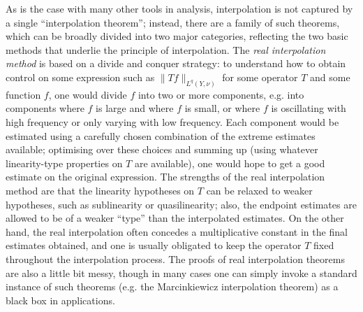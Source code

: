 \documentclass[10pt,reqno]{amsart}
\begin{document}
As is the case with many other tools in analysis, interpolation is not captured by a single “interpolation theorem”; instead, there are a family of such theorems, which can be broadly divided into two major categories, reflecting the two basic methods that underlie the principle of interpolation. The \emph{real interpolation method} is based on a divide and conquer strategy: to understand how to obtain control on some expression such as $\| T f \|_{L^q(Y, \nu)}$ for some operator $T$ and some function $f$, one would divide $f$ into two or more components, e.g. into components where $f$ is large and where $f$ is small, or where $f$ is oscillating with high frequency or only varying with low frequency. Each component would be estimated using a carefully chosen combination of the extreme estimates available; optimising over these choices and summing up (using whatever linearity-type properties on $T$ are available), one would hope to get a good estimate on the original expression. The strengths of the real interpolation method are that the linearity hypotheses on $T$ can be relaxed to weaker hypotheses, such as sublinearity or quasilinearity; also, the endpoint estimates are allowed to be of a weaker “type” than the interpolated estimates. On the other hand, the real interpolation often concedes a multiplicative constant in the final estimates obtained, and one is usually obligated to keep the operator $T$ fixed throughout the interpolation process. The proofs of real interpolation theorems are also a little bit messy, though in many cases one can simply invoke a standard instance of such theorems (e.g. the Marcinkiewicz interpolation theorem) as a black box in applications.
\end{document}
